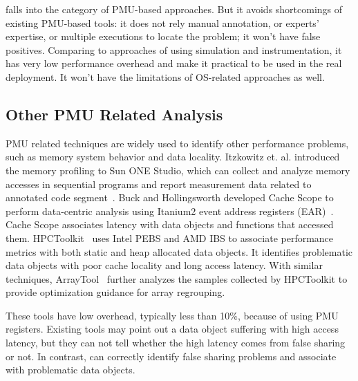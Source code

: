 \cheetah{} falls into the category of PMU-based approaches. But it avoids shortcomings of existing PMU-based tools: it does not rely manual annotation, or experts' expertise, or multiple executions to locate the problem; it won't have false positives. Comparing to approaches of using simulation and instrumentation, it has very low performance overhead and make it practical to be used in the real deployment. It won't have the limitations of OS-related approaches as well.  


\subsection{Other PMU Related Analysis}

PMU related techniques are widely used to identify other performance problems, such as memory system behavior and data locality. Itzkowitz et. al. introduced the memory profiling to Sun ONE Studio, which can collect and analyze memory accesses in sequential programs and report measurement data related to annotated code segment~\cite{DBLP:conf/sc/ItzkowitzWAK03}. Buck and Hollingsworth developed Cache Scope to perform data-centric analysis using Itanium2 event address registers (EAR)~\cite{DBLP:conf/sc/BuckH04}. Cache Scope associates latency with data objects and functions that accessed them. HPCToolkit~\cite{ibs-sc} uses Intel PEBS and AMD IBS to associate performance metrics with both static and heap allocated data objects. It identifies problematic data objects with poor cache locality and long access latency. With similar techniques, ArrayTool~\cite{ibs-pact} further analyzes the samples collected by HPCToolkit to provide optimization guidance for array regrouping.

These tools have low overhead, typically less than 10\%, because of using PMU registers. Existing tools may point out a data object suffering with high access latency, but they can not tell whether the high latency comes from false sharing or not. In contrast, \cheetah{} can correctly identify false sharing problems and associate with problematic data objects.

